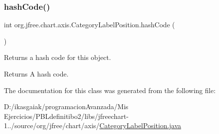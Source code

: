 \subsubsection{\texorpdfstring{hash\+Code()}{hashCode()}}
{\footnotesize\ttfamily int org.\+jfree.\+chart.\+axis.\+Category\+Label\+Position.\+hash\+Code (\begin{DoxyParamCaption}{ }\end{DoxyParamCaption})}

Returns a hash code for this object.

\begin{DoxyReturn}{Returns}
A hash code. 
\end{DoxyReturn}


The documentation for this class was generated from the following file\+:\begin{DoxyCompactItemize}
\item 
D\+:/ikasgaiak/programacion\+Avanzada/\+Mis Ejercicios/\+P\+B\+Ldefinitibo2/libs/jfreechart-\/1../source/org/jfree/chart/axis/\mbox{\hyperlink{_category_label_position_8java}{Category\+Label\+Position.\+java}}\end{DoxyCompactItemize}
